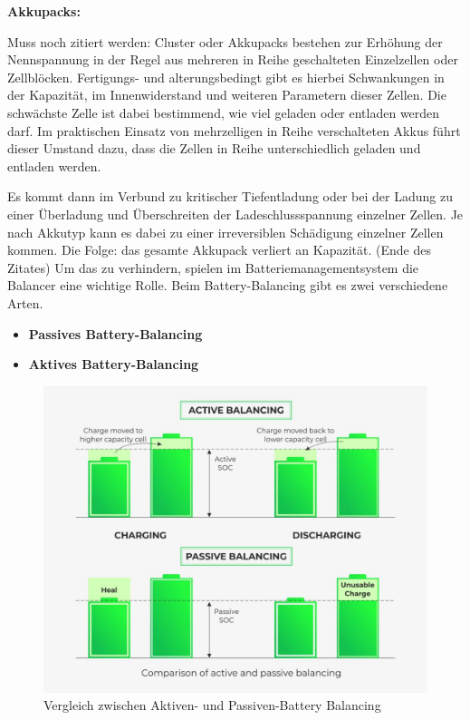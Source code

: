 \textbf{Akkupacks:}

Muss noch zitiert werden: Cluster oder Akkupacks bestehen zur Erhöhung der Nennspannung in der Regel aus mehreren in Reihe geschalteten Einzelzellen oder Zellblöcken. Fertigungs- und alterungsbedingt gibt es hierbei Schwankungen in der Kapazität, im Innenwiderstand und weiteren Parametern dieser Zellen. Die schwächste Zelle ist dabei bestimmend, wie viel geladen oder entladen werden darf. Im praktischen Einsatz von mehrzelligen in Reihe verschalteten Akkus führt dieser Umstand dazu, dass die Zellen in Reihe unterschiedlich geladen und entladen werden.

Es kommt dann im Verbund zu kritischer Tiefentladung oder bei der Ladung zu einer Überladung und Überschreiten der Ladeschlussspannung einzelner Zellen. Je nach Akkutyp kann es dabei zu einer irreversiblen Schädigung einzelner Zellen kommen. Die Folge: das gesamte Akkupack verliert an Kapazität. (Ende des Zitates)
Um das zu verhindern, spielen im Batteriemanagementsystem die Balancer eine wichtige Rolle. Beim Battery-Balancing gibt es zwei verschiedene Arten. 
\begin{itemize}
\item \textbf{Passives Battery-Balancing} \medskip\\
\item \textbf{Aktives Battery-Balancing} \medskip\\
\end{itemize}

\begin{figure}[H]
	\begin{center}
		\includegraphics[scale=1.5]{figures/Akku/Vergleichaktivespassives.jpg}
		\caption{Vergleich zwischen Aktiven- und Passiven-Battery Balancing}
	\end{center}
\end{figure}
\newpage

